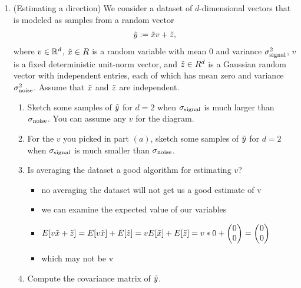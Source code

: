 \documentclass[12pt,twoside]{article}
\begin{document}
\begin{enumerate}
\item (Estimating a direction) We consider a dataset of $d$-dimensional vectors that is modeled as samples from a random vector
\begin{align}
\tilde{  y } := \tilde{ x }v + \tilde{  z },
\end{align}
where $v \in \mathbb{R}^d$, $\tilde{ x } \in R$ is a random variable with mean 0 and variance $\sigma_{\operatorname{signal}}^2$, $v$ is a fixed deterministic unit-norm vector, and $\tilde{  z } \in R^d$ is a Gaussian random vector with independent entries, each of which has mean zero and variance $\sigma_{\operatorname{noise}}^2$. Assume that $\tilde{ x }$ and $\tilde{  z }$ are independent.
\begin{enumerate}
\item Sketch some samples of $\tilde{  y }$ for $d=2$ when $\sigma_{\operatorname{signal}}$ is much larger than $\sigma_{\operatorname{noise}}$. You can assume any $v$ for the diagram.  
\item For the $v$ you picked in part $(a)$, sketch some samples of $\tilde{  y }$ for $d=2$ when $\sigma_{\operatorname{signal}}$ is much smaller than $\sigma_{\operatorname{noise}}$.  
\item Is averaging the dataset a good algorithm for estimating $v$?  
\begin{itemize}
  \color{blue}
  \item no averaging the dataset will not get us a good estimate of v
  \item we can examine the expected value of our variables
  \item $E[v\Tilde{x}+\Tilde{z}]=E[v\Tilde{x}]+E[\Tilde{z}]=vE[\Tilde{x}]+E[\Tilde{z}]=v*0+\begin{pmatrix}
    0\\0
  \end{pmatrix}=\begin{pmatrix}
    0\\0
  \end{pmatrix}$
  \item which may not be v
\end{itemize}
\item Compute the covariance matrix of $\tilde{  y }$. 
\end{enumerate}
\end{enumerate}
\end{document}
